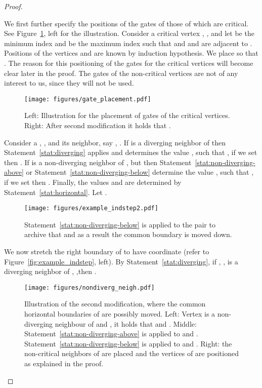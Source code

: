 \documentclass{llncs}
\begin{document}
\begin{proof}
\begin{description}
We first further specify the positions of the gates of those of  which are critical. See Figure~\ref{fig:gate_placement}, left for the illustration.  Consider a critical vertex , , and let   be the minimum index and  be the maximum index such that  and  and   are adjacent to . Positions of the vertices  and  are known by induction hypothesis. We place  so that . The reason for this positioning of the gates for the critical vertices will become clear later in the proof.  The gates of the non-critical vertices are not of any interest to us, since they will not be used. 


\begin{figure}[htb]
\centering
\texttt{[image: figures/gate\_placement.pdf]}
\caption{\small Left: Illustration for the placement of gates of the critical vertices. Right: After second modification it holds that . }
\label{fig:gate_placement} 
\end{figure}

Consider a , , and its neighbor, say , . If  is a diverging neighbor of  then  Statement~\ref{stat:diverging} applies and determines the value ,  such that  ,  if we set   then .  If  is a non-diverging neighbor of , but  then Statement~\ref{stat:non-diverging-above} or Statement~\ref{stat:non-diverging-below} determine the value , such that ,  if we set   then .   Finally, the values  and  are determined by Statement~\ref{stat:horizontal}.
Let .

\begin{figure}[htb]
\centering
\texttt{[image: figures/example\_indstep2.pdf]}
\caption{\small  Statement~\ref{stat:non-diverging-below} is applied to the pair  to archive that  and as a result the common boundary  is moved down.}
\label{fig:example_indstep2} 
\end{figure}

We now stretch the right boundary of  to have coordinate  (refer to Figure~\ref{fig:example_indstep}, left). By Statement~\ref{stat:diverging}, if ,  , is a diverging neighbor of ,  ,then  . 


\begin{figure}[htb]
\centering
\texttt{[image: figures/nondiverg\_neigh.pdf]}
\caption{\small  Illustration of the second  modification, where the common horizontal boundaries of  are possibly moved. Left:  Vertex   is a non-diverging neighbour of  and ,  it holds that  and .  Middle: Statement~\ref{stat:non-diverging-above} is applied to  and . Statement~\ref{stat:non-diverging-below} is applied to  and . Right: the non-critical neighbors of  are placed and the vertices of  are positioned as explained in the proof. }
\label{fig:nondiverg_neigh} 
\end{figure}


\end{description}
\end{proof}
\end{document}
